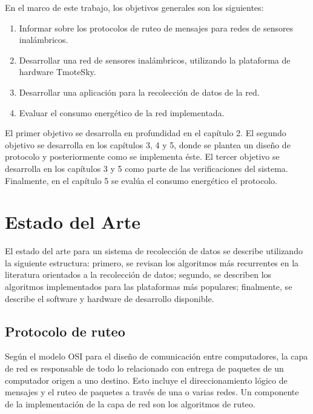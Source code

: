 En el marco de este trabajo, los objetivos generales son los siguientes:
\begin{enumerate}
  \item Informar sobre los protocolos de ruteo de mensajes para redes de sensores inalámbricos.
  \item Desarrollar una red de sensores inalámbricos, utilizando la plataforma de hardware TmoteSky.
  \item Desarrollar una aplicación para la recolección de datos de la red.
  \item Evaluar el consumo energético de la red implementada.
\end{enumerate}

 El primer objetivo se desarrolla en profundidad en el capítulo 2. El segundo objetivo se desarrolla en los capítulos 3, 4 y 5, donde se plantea un diseño de protocolo y posteriormente como se implementa éste. El tercer objetivo se desarrolla en los capítulos 3 y 5 como parte de las verificaciones del sistema. Finalmente, en el capítulo 5 se evalúa el consumo energético el protocolo.\\
 
\section{Estado del Arte}
El estado del arte para un sistema de recolección de datos se describe utilizando la siguiente estructura: primero, se revisan los algoritmos más recurrentes en la literatura orientados a la recolección de datos; segundo, se describen los algoritmos implementados para las plataformas más populares; finalmente, se describe el software y hardware de desarrollo disponible.

\subsection{Protocolo de ruteo}
Según el modelo OSI para el diseño de comunicación entre computadores, la capa de red es responsable de todo lo relacionado con entrega de paquetes de un computador origen a uno destino. Esto incluye el direccionamiento lógico de mensajes y el ruteo de paquetes a través de una o varias redes. Un componente de la implementación de la capa de red son los algoritmos de ruteo. \\


